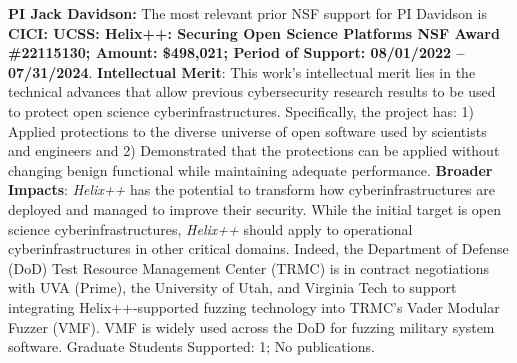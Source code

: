 
\newenvironment{itemizet}{
  \begin{itemize}
  \setlength{\itemsep}{1pt}
  \setlength{\parskip}{0pt}
  \setlength{\parsep}{0pt}}{\end{itemize}
}


\vspace{1ex}
\noindent\textbf{PI Jack Davidson:}  The most relevant prior NSF support for PI Davidson is  
\textbf{CICI: UCSS: Helix++: Securing Open Science Platforms  
NSF Award \#22115130; Amount: \$498,021; Period of Support: 08/01/2022 -- 07/31/2024}. 
\textbf{Intellectual Merit}: This work's intellectual merit lies in the technical advances 
that allow previous cybersecurity research results to be used to protect open science cyberinfrastructures.
Specifically, the project has:
1)
Applied protections to the diverse universe of open software used by scientists and engineers and 2)
Demonstrated that the protections can be applied without changing benign functional while maintaining adequate performance.
\textbf{Broader Impacts}:
\textit{Helix++} has the potential to transform how cyberinfrastructures are deployed and managed to improve their security.
While the initial target is open science cyberinfrastructures, \textit{Helix++} should apply to operational cyberinfrastructures 
in other critical domains.
Indeed, the Department of Defense (DoD) Test Resource Management Center (TRMC) is in contract negotiations with UVA (Prime), the University of Utah, and Virginia Tech to support integrating Helix++-supported fuzzing technology into TRMC's Vader Modular Fuzzer (VMF).
VMF is widely used across the DoD for fuzzing military system software.
Graduate Students Supported: 1; No publications.



